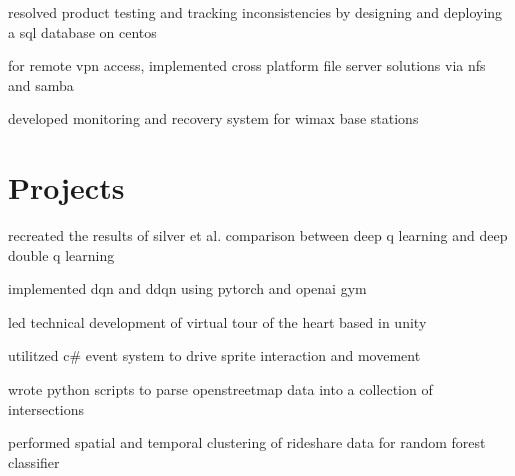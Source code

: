 \begin{minipage}[t]{0.66\textwidth}
\begin{tightitemize}
    \item resolved product testing and tracking inconsistencies by designing and deploying a sql database on centos
    \item for remote vpn access, implemented cross platform file server solutions via nfs and samba
    \item developed monitoring and recovery system for wimax base stations
\end{tightitemize}

\section{Projects}
\descript{}
\begin{tightitemize}
    \item recreated the results of silver et al. comparison between deep q learning and deep double q learning 
    \item implemented dqn and ddqn using pytorch and openai gym
\end{tightitemize}

\descript{}
\begin{tightitemize}
    \item led technical development of virtual tour of the heart based in unity
    \item utilitzed c\# event system to drive sprite interaction and movement
\end{tightitemize}

\descript{}
\begin{tightitemize}
    \item wrote python scripts to parse openstreetmap data into a collection of intersections
    \item performed spatial and temporal clustering of rideshare data for random forest classifier
\end{tightitemize}



\end{minipage} %
\vspace*{\fill}